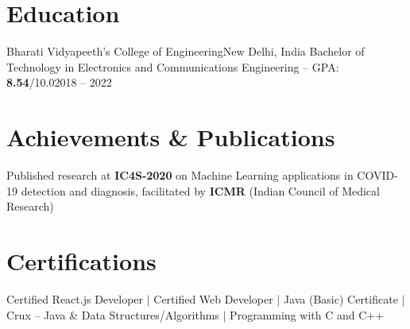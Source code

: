 \section{Education}
  \resumeSubHeadingListStart
    \resumeSubheading
      {Bharati Vidyapeeth's College of Engineering}{New Delhi, India}
      {Bachelor of Technology in Electronics and Communications Engineering -- GPA: \textbf{8.54}/10.0}{2018 -- 2022}
  \resumeSubHeadingListEnd

\section{Achievements \& Publications}
 \begin{itemize}[leftmargin=0.15in, label={}]
    \small{\item{
     Published research at \textbf{IC4S-2020} on Machine Learning applications in COVID-19 detection and diagnosis, facilitated by \textbf{ICMR} (Indian Council of Medical Research)
    }}
 \end{itemize}

\section{Certifications}
 \begin{itemize}[leftmargin=0.15in, label={}]
    \small{\item{
     Certified React.js Developer $|$ Certified Web Developer $|$ Java (Basic) Certificate $|$ Crux -- Java \& Data Structures/Algorithms $|$ Programming with C and C++
    }}
 \end{itemize}
